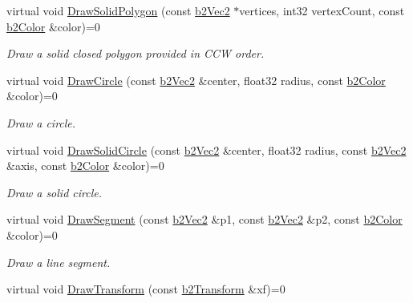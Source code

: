 \begin{DoxyCompactItemize}
\mbox{\label{classb2Draw_a76f2d67de0781a32cab116278c5c9eea}} 
virtual void \hyperlink{classb2Draw_a76f2d67de0781a32cab116278c5c9eea}{Draw\+Solid\+Polygon} (const \hyperlink{structb2Vec2}{b2\+Vec2} $\ast$vertices, int32 vertex\+Count, const \hyperlink{structb2Color}{b2\+Color} \&color)=0
\begin{DoxyCompactList}\small\item\em Draw a solid closed polygon provided in C\+CW order. \end{DoxyCompactList}\item 
\mbox{\label{classb2Draw_ae2effe9bca87c8d7cb90e860d13b7e9e}} 
virtual void \hyperlink{classb2Draw_ae2effe9bca87c8d7cb90e860d13b7e9e}{Draw\+Circle} (const \hyperlink{structb2Vec2}{b2\+Vec2} \&center, float32 radius, const \hyperlink{structb2Color}{b2\+Color} \&color)=0
\begin{DoxyCompactList}\small\item\em Draw a circle. \end{DoxyCompactList}\item 
\mbox{\label{classb2Draw_a775a1d0472c5980d597904c7b596a0a6}} 
virtual void \hyperlink{classb2Draw_a775a1d0472c5980d597904c7b596a0a6}{Draw\+Solid\+Circle} (const \hyperlink{structb2Vec2}{b2\+Vec2} \&center, float32 radius, const \hyperlink{structb2Vec2}{b2\+Vec2} \&axis, const \hyperlink{structb2Color}{b2\+Color} \&color)=0
\begin{DoxyCompactList}\small\item\em Draw a solid circle. \end{DoxyCompactList}\item 
\mbox{\label{classb2Draw_a1de5aaf50db875d1c644c596832af57d}} 
virtual void \hyperlink{classb2Draw_a1de5aaf50db875d1c644c596832af57d}{Draw\+Segment} (const \hyperlink{structb2Vec2}{b2\+Vec2} \&p1, const \hyperlink{structb2Vec2}{b2\+Vec2} \&p2, const \hyperlink{structb2Color}{b2\+Color} \&color)=0
\begin{DoxyCompactList}\small\item\em Draw a line segment. \end{DoxyCompactList}\item 
virtual void \hyperlink{classb2Draw_ade698123482a491a7a61fa1fe4d3a4f4}{Draw\+Transform} (const \hyperlink{structb2Transform}{b2\+Transform} \&xf)=0
\item 

\end{DoxyCompactItemize}
